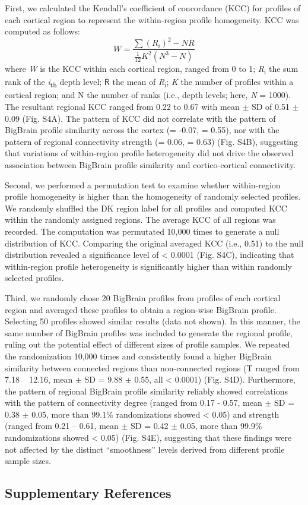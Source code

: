 \begin{refsection}
First, we calculated the Kendall's coefficient of concordance (KCC) for profiles of each cortical region to represent the within-region profile homogeneity. KCC was computed as follows:
\[
W = \frac{\sum (R_{i})^{2} - N\overline{R}}{\frac{1}{12} K^{2}(N^{3} - N)} \]
where \textit{W} is the KCC within each cortical region, ranged from 0 to 1; \textit{R}\textsubscript{i} the sum rank of the \textit{i}\textsubscript{th} depth level; $\mathsf{\overline{R}}$ the mean of \textit{R}\textsubscript{i}; \textit{K} the number of profiles within a cortical region; and N the number of ranks (i.e., depth levels; here, \textit{N} = 1000). The resultant regional KCC ranged from 0.22 to 0.67 with mean $\pm$ SD of 0.51 $\pm$ 0.09 (Fig. S4A). The pattern of KCC did not correlate with the pattern of BigBrain profile similarity across the cortex (\rval = -0.07, \pval = 0.55), nor with the pattern of regional connectivity strength (\rval = 0.06, \pval = 0.63) (Fig. S4B), suggesting that variations of within-region profile heterogeneity did not drive the observed association between BigBrain profile similarity and cortico-cortical connectivity.

Second, we performed a permutation test to examine whether within-region profile homogeneity is higher than the homogeneity of randomly selected profiles. We randomly shuffled the DK region label for all profiles and computed KCC within the randomly assigned regions. The average KCC of all regions was recorded. The computation was permutated 10,000 times to generate a null distribution of KCC. Comparing the original averaged KCC (i.e., 0.51) to the null distribution revealed a significance level of \pval < 0.0001 (Fig. S4C), indicating that within-region profile heterogeneity is significantly higher than within randomly selected profiles.

Third, we randomly chose 20 BigBrain profiles from profiles of each cortical region and averaged these profiles to obtain a region-wise BigBrain profile. Selecting 50 profiles showed similar results (data not shown). In this manner, the same number of BigBrain profiles was included to generate the regional profile, ruling out the potential effect of different sizes of profile samples. We repeated the randomization 10,000 times and consistently found a higher BigBrain similarity between connected regions than non-connected regions (T ranged from 7.18 ~ 12.16, mean $\pm$ SD = 9.88 $\pm$ 0.55, all \pval < 0.0001) (Fig. S4D). Furthermore, the pattern of regional BigBrain profile similarity reliably showed correlations with the pattern of connectivity degree (\rval ranged from 0.17 - 0.57, mean $\pm$ SD = 0.38 $\pm$ 0.05, more than 99.1\% randomizations showed \pval < 0.05) and strength (\rval ranged from 0.21 – 0.61, mean $\pm$ SD = 0.42 $\pm$ 0.05, more than 99.9\% randomizations showed \pval < 0.05) (Fig. S4E), suggesting that these findings were not affected by the distinct “smoothness” levels derived from different profile sample sizes.

\subsection*{Supplementary References}
\printbibliography[heading=none]

\end{refsection}


